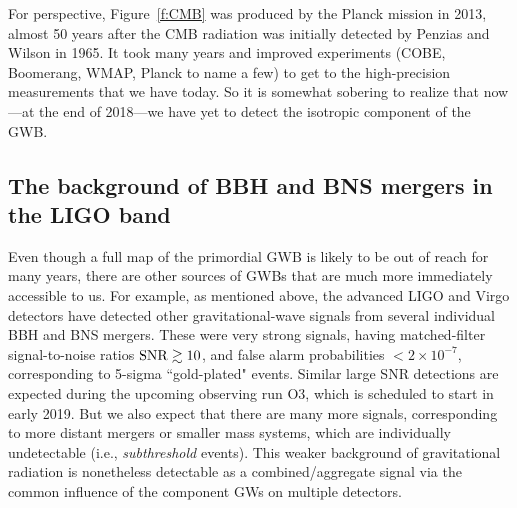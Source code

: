 \documentclass[11pt]{article}
\numberwithin{equation}{section}
\begin{document}
For perspective, Figure~\ref{f:CMB} was produced by 
the Planck mission in 2013,
almost 50 years after the CMB radiation was initially
detected by Penzias and Wilson in 1965.
It took many years and improved experiments
(COBE, Boomerang, WMAP, Planck to name a few) to get to 
the high-precision measurements that we have today.
So it is somewhat sobering to realize that now---at the 
end of 2018---we have yet to detect the isotropic component 
of the GWB.

\subsection{The background of BBH and BNS mergers in the 
LIGO band}
\label{s:BBH-BNS-LIGO}

Even though a full map of the primordial GWB is likely
to be out of reach for many years, there are other
sources of GWBs that are much more immediately accessible
to us.
For example, as mentioned above, the advanced LIGO
and Virgo detectors have detected other 
gravitational-wave signals from several individual BBH 
and BNS mergers.
These were very strong signals, having 
matched-filter signal-to-noise ratios ${\rm SNR}\gtrsim 10$, 
and false alarm probabilities $<2\times 10^{-7}$,
corresponding to 5-sigma ``gold-plated" events.
Similar large SNR detections are expected during the 
upcoming observing run O3, which is scheduled to start in early 2019.
But we also expect that there are many more signals, 
corresponding to more distant mergers or smaller mass systems, 
which are 
individually undetectable (i.e., {\em subthreshold} events).
This weaker background of gravitational radiation is 
nonetheless detectable as a combined/aggregate signal
via the common influence of the component GWs on 
multiple detectors.
\end{document}
